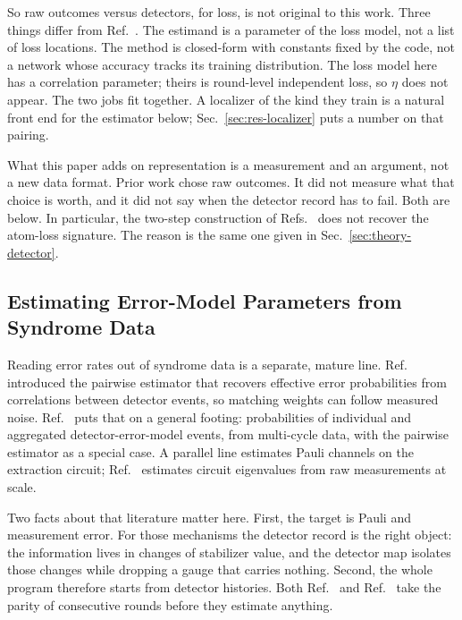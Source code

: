\documentclass{ieeeaccess}
\begin{document}
So raw outcomes versus detectors, for loss, is not original to this work.
Three things differ from Ref.~\cite{wang2026aiqubitloss}. The estimand is a
parameter of the loss model, not a list of loss locations. The method is
closed-form with constants fixed by the code, not a network whose accuracy
tracks its training distribution. The loss model here has a correlation
parameter; theirs is round-level independent loss, so $\eta$ does not appear.
The two jobs fit together. A localizer of the kind they train is a natural
front end for the estimator below; Sec.~\ref{sec:res-localizer} puts a number
on that pairing.

What this paper adds on representation is a measurement and an argument, not a
new data format. Prior work chose raw outcomes. It did not measure what that
choice is worth, and it did not say when the detector record has to fail. Both
are below. In particular, the two-step construction of
Refs.~\cite{bultink2020repetitiveparity,varbanov2020leakagedetection} does not
recover the atom-loss signature. The reason is the same one given in
Sec.~\ref{sec:theory-detector}.

\subsection{Estimating Error-Model Parameters from Syndrome Data}
\label{sec:rel-estimation}

Reading error rates out of syndrome data is a separate, mature line.
Ref.~\cite{spitz2018adaptiveweight} introduced the pairwise estimator that
recovers effective error probabilities from correlations between detector
events, so matching weights can follow measured noise.
Ref.~\cite{blumekohout2025detectorerrormodels} puts that on a general footing:
probabilities of individual and aggregated detector-error-model events, from
multi-cycle data, with the pairwise estimator as a special case. A parallel
line estimates Pauli channels on the extraction circuit;
Ref.~\cite{hockings2025aces} estimates circuit eigenvalues from raw
measurements at scale.

Two facts about that literature matter here. First, the target is Pauli and
measurement error. For those mechanisms the detector record is the right
object: the information lives in changes of stabilizer value, and the
detector map isolates those changes while dropping a gauge that carries
nothing. Second, the whole program therefore starts from detector histories.
Both Ref.~\cite{spitz2018adaptiveweight} and
Ref.~\cite{blumekohout2025detectorerrormodels} take the parity of consecutive
rounds before they estimate anything.
\end{document}
